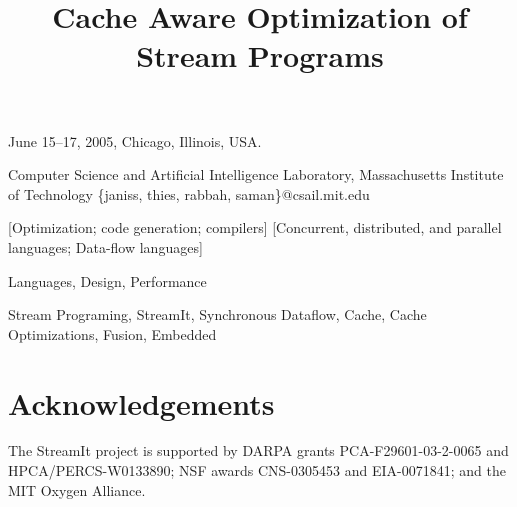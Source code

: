 \documentclass[preprint]{sigplanconf}
\begin{document}
 {June 15--17, 2005, Chicago, Illinois, USA.}

\title{Cache Aware Optimization of Stream Programs}
	     {Computer Science and Artificial Intelligence Laboratory, Massachusetts Institute of Technology}
	     {\{janiss, thies, rabbah, saman\}@csail.mit.edu}

\maketitle

\begin{abstract}

\end{abstract}

[Optimization; code generation; compilers]
[Concurrent, distributed, and parallel languages; Data-flow languages]

\terms 
Languages, Design, Performance

\keywords
Stream Programing, StreamIt, Synchronous Dataflow, Cache, Cache
Optimizations, Fusion, Embedded










\section{Acknowledgements}
The StreamIt project is
supported by DARPA grants PCA-F29601-03-2-0065 and
HPCA/PERCS-W0133890; NSF awards CNS-0305453 and EIA-0071841; and the
MIT Oxygen Alliance.






\end{document}
